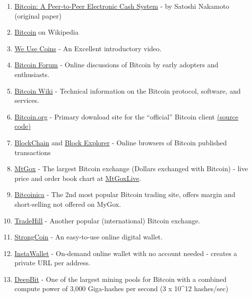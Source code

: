 \documentclass[12pt,twocolumn]{article}
\begin{document}
\begin{enumerate}[1.]
\item
  \href{http://bitcoin.org/bitcoin.pdf}{Bitcoin: A Peer-to-Peer
  Electronic Cash System} - by Satoshi Nakamoto (original paper)
\item
  \href{http://en.wikipedia.org/wiki/Bitcoin}{Bitcoin} on Wikipedia
\item
  \href{http://www.weusecoins.com/}{We Use Coins} - An Excellent
  introductory video.
\item
  \href{https://bitcointalk.org/}{Bitcoin Forum} - Online discussions of
  Bitcoin by early adopters and enthusiasts.
\item
  \href{https://en.bitcoin.it/wiki/Main\_Page}{Bitcoin Wiki} - Technical
  information on the Bitcoin protocol, software, and services.
\item
  \href{http://bitcoin.org/}{Bitcoin.org} - Primary download site for
  the ``official'' Bitcoin client
  \href{https://github.com/bitcoin/bitcoin}{(source code)}
\item
  \href{http://blockchain.info/}{BlockChain} and
  \href{http://blockexplorer.com/}{Block Explorer} - Online browsers of
  Bitcoin published transactions
\item
  \href{https://mtgox.com/}{MtGox} - The largest Bitcoin exchange
  (Dollars exchanged with Bitcoin) - live price and order book chart at
  \href{http://mtgoxlive.com/orders}{MtGoxLive}.
\item
  \href{https://bitcoinica.com/trading}{Bitcoinica} - The 2nd most
  popular Bitcoin trading site, offers margin and short-selling not
  offered on MyGox.
\item
  \href{https://www.tradehill.com/}{TradeHill} - Another popular
  (international) Bitcoin exchange.
\item
  \href{https://strongcoin.com/}{StrongCoin} - An easy-to-use online
  digital wallet.
\item
  \href{https://www.instawallet.org/}{InstaWallet} - On-demand online
  wallet with no account needed - creates a private URL per address.
\item
  \href{https://deepbit.net/}{DeepBit} - One of the largest mining pools
  for Bitcoin with a combined compute power of 3,000 Giga-hashes per
  second (3 x 10\^{}12 hashes/sec)
\end{enumerate}
\end{document}
